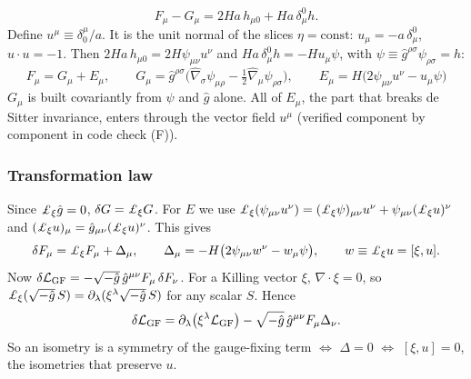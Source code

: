 \begin{equation*}
F_\mu-G_\mu=2Ha\,h_{\mu0}+Ha\,\delta^0_\mu h .
\end{equation*}
Define $u^\mu\equiv\delta^\mu_0/a$. It is the unit normal of the slices $\eta=\text{const}$: $u_\mu=-a\,\delta^0_\mu$, $u\cdot u=-1$.
Then $2Ha\,h_{\mu0}=2H\psi_{\mu\nu}u^\nu$ and $Ha\,\delta^0_\mu h=-Hu_\mu\psi$, with $\psi\equiv\hat g^{\rho\sigma}\psi_{\rho\sigma}=h$:
\begin{equation}
\boxed{\;F_\mu=G_\mu+E_\mu,\qquad G_\mu=\hat g^{\rho\sigma}\big(\hat\nabla_\sigma\psi_{\mu\rho}-\tfrac12\hat\nabla_\mu\psi_{\rho\sigma}\big),\qquad E_\mu=H\big(2\psi_{\mu\nu}u^\nu-u_\mu\psi\big)\;}
\label{eq:ch7-FGE}
\end{equation}
$G_\mu$ is built covariantly from $\psi$ and $\hat g$ alone.
All of $E_\mu$, \ie the part that breaks de Sitter invariance, enters through the vector field $u^\mu$
(verified component by component in code check (F)).

\subsubsection{Transformation law}
\tD{}
Since $\chsevLie_\xi\hat g=0$, $\delta G=\chsevLie_\xi G$.
For $E$ we use $\chsevLie_\xi(\psi_{\mu\nu}u^\nu)=(\chsevLie_\xi\psi)_{\mu\nu}u^\nu+\psi_{\mu\nu}(\chsevLie_\xi u)^\nu$ and $(\chsevLie_\xi u)_\mu=\hat g_{\mu\nu}(\chsevLie_\xi u)^\nu$. This gives
\begin{equation}
\delta F_\mu=\chsevLie_\xi F_\mu+\Delta_\mu,\qquad \Delta_\mu=-H\big(2\psi_{\mu\nu}w^\nu-w_\mu\psi\big),\qquad w\equiv\chsevLie_\xi u=[\xi,u].
\label{eq:ch7-deltaF}
\end{equation}
Now $\delta\mathcal{L}_{\mathrm{GF}}=-\sqrt{-\hat g}\,\hat g^{\mu\nu}F_\mu\,\delta F_\nu$.
For a Killing vector $\xi$, $\nabla\cdot\xi=0$, so $\chsevLie_\xi(\sqrt{-\hat g}\,S)=\partial_\lambda(\xi^\lambda\sqrt{-\hat g}\,S)$ for any scalar $S$. Hence
\begin{equation}
\delta\mathcal{L}_{\mathrm{GF}}=\partial_\lambda\big(\xi^\lambda\mathcal{L}_{\mathrm{GF}}\big)-\sqrt{-\hat g}\,\hat g^{\mu\nu}F_\mu\Delta_\nu .
\label{eq:ch7-deltaL}
\end{equation}
So an isometry is a symmetry of the gauge-fixing term $\Longleftrightarrow$ $\Delta=0$ $\Longleftrightarrow$ $[\xi,u]=0$, \ie the isometries that preserve $u$.

